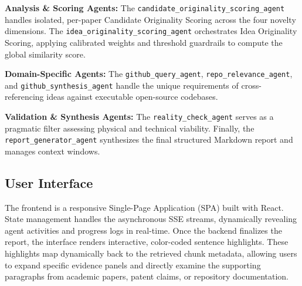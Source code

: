 \textbf{Analysis \& Scoring Agents:} The \texttt{candidate\_\allowbreak originality\_\allowbreak scoring\_\allowbreak agent} handles isolated, per-paper Candidate Originality Scoring across the four novelty dimensions. The \texttt{idea\_\allowbreak originality\_\allowbreak scoring\_\allowbreak agent} orchestrates Idea Originality Scoring, applying calibrated weights and threshold guardrails to compute the global similarity score.

\textbf{Domain-Specific Agents:} The \texttt{github\_\allowbreak query\_\allowbreak agent}, \texttt{repo\_\allowbreak relevance\_\allowbreak agent}, and \texttt{github\_\allowbreak synthesis\_\allowbreak agent} handle the unique requirements of cross-referencing ideas against executable open-source codebases.

\textbf{Validation \& Synthesis Agents:} The \texttt{reality\_\allowbreak check\_\allowbreak agent} serves as a pragmatic filter assessing physical and technical viability. Finally, the \texttt{report\_\allowbreak generator\_\allowbreak agent} synthesizes the final structured Markdown report and manages context windows.

\subsection{User Interface}

The frontend is a responsive Single-Page Application (SPA) built with React. State management handles the asynchronous SSE streams, dynamically revealing agent activities and progress logs in real-time. Once the backend finalizes the report, the interface renders interactive, color-coded sentence highlights. These highlights map dynamically back to the retrieved chunk metadata, allowing users to expand specific evidence panels and directly examine the supporting paragraphs from academic papers, patent claims, or repository documentation.
